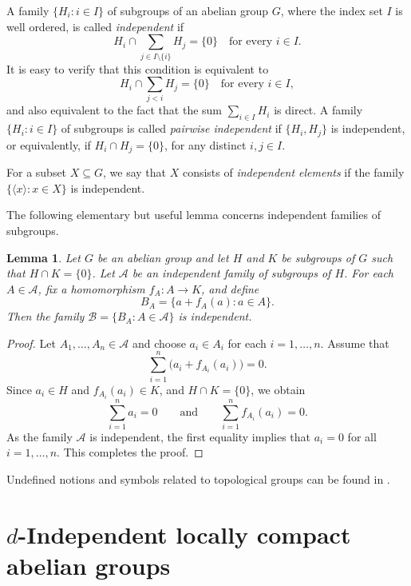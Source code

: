 \documentclass[12pt]{amsart}
\newtheorem{lemma}[theorem]{Lemma}
\theoremstyle{definition}
\theoremstyle{remark}
\newcommand{\N}{\mathbb{N}}
\newcommand{\hull}[1]{\langle #1 \rangle}
\begin{document}

A family $\{H_i: i\in I\}$ of subgroups of an abelian group $G$, where the index
set $I$ is well ordered, is called \emph{independent} if
\[
H_i\cap \sum_{j\in I\setminus\{i\}} H_j=\{0\}
\quad\text{for every } i\in I.
\]
It is easy to verify that this condition is equivalent to
\[
H_i\cap \sum_{j<i} H_j=\{0\}
\quad\text{for every } i\in I,
\]
and also equivalent to the fact that the sum $\sum_{i\in I} H_i$ is direct.
A family $\{H_i:i\in I\}$ of subgroups is called \emph{pairwise independent} if $\{H_i, H_j\}$ is independent, or equivalently, if $H_i\cap H_j=\{0\}$,  for any distinct $i,j\in I$.

For a subset $X\subseteq G$, we say that $X$ consists of \emph{independent elements}
if the family $\{\hull{x}: x\in X\}$ is independent.


The following elementary but useful lemma concerns independent families of
subgroups.

\begin{lemma}\label{indfam}
Let $G$ be an abelian group and let $H$ and $K$ be subgroups of $G$ such that
$H\cap K=\{0\}$.
Let $\mathcal{A}$ be an independent family of subgroups of $H$.
For each $A\in \mathcal{A}$, fix a homomorphism $f_A\colon A\to K$, and define
\[
B_A=\{a+f_A(a): a\in A\}.
\]
Then the family $\mathcal{B}=\{B_A: A\in \mathcal{A}\}$ is independent.
\end{lemma}

\begin{proof}
Let $A_1,\dots,A_n\in \mathcal{A}$ and choose $a_i\in A_i$ for each
$i=1,\dots,n$.
Assume that
\[
\sum_{i=1}^n \bigl(a_i+f_{A_i}(a_i)\bigr)=0.
\]
Since $a_i\in H$ and $f_{A_i}(a_i)\in K$, and $H\cap K=\{0\}$, we obtain
\[
\sum_{i=1}^n a_i=0
\qquad\text{and}\qquad
\sum_{i=1}^n f_{A_i}(a_i)=0.
\]
As the family $\mathcal{A}$ is independent, the first equality implies that
$a_i=0$ for all $i=1,\dots,n$.
This completes the proof.
\end{proof}

Undefined notions and symbols related to topological groups can be found in
\cite{ADG,AT}.

\section{$d$-Independent locally compact abelian groups}\label{S2}
\end{document}
